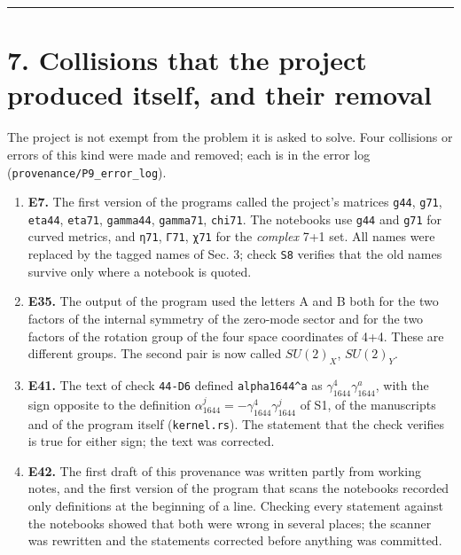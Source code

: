 \documentclass[
  10pt,
]{article}
\providecommand{\tightlist}{%
  \setlength{\itemsep}{0pt}\setlength{\parskip}{0pt}}
\begin{document}
\begin{center}\rule{0.5\linewidth}{0.5pt}\end{center}

\hypertarget{collisions-that-the-project-produced-itself-and-their-removal}{%
\section{7. Collisions that the project produced itself, and their
removal}\label{collisions-that-the-project-produced-itself-and-their-removal}}

The project is not exempt from the problem it is asked to solve. Four
collisions or errors of this kind were made and removed; each is in the
error log (\texttt{provenance/P9\_error\_log}).

\begin{enumerate}
\def\labelenumi{\arabic{enumi}.}
\tightlist
\item
  \textbf{E7.} The first version of the programs called the project's
  matrices \texttt{g44}, \texttt{g71}, \texttt{eta44}, \texttt{eta71},
  \texttt{gamma44}, \texttt{gamma71}, \texttt{chi71}. The notebooks use
  \texttt{g44} and \texttt{g71} for curved metrics, and \texttt{η71},
  \texttt{Γ71}, \texttt{χ71} for the \emph{complex} 7+1 set. All names
  were replaced by the tagged names of Sec. 3; check \texttt{S8}
  verifies that the old names survive only where a notebook is quoted.
\item
  \textbf{E35.} The output of the program used the letters A and B both
  for the two factors of the internal symmetry of the zero-mode sector
  and for the two factors of the rotation group of the four space
  coordinates of 4+4. These are different groups. The second pair is now
  called \(SU(2)_X\), \(SU(2)_Y\).
\item
  \textbf{E41.} The text of check \texttt{44-D6} defined
  \texttt{alpha1644\^{}a} as \(\gamma_{1644}^4\gamma_{1644}^a\), with
  the sign opposite to the definition
  \(\alpha_{1644}^j=-\gamma_{1644}^4\gamma_{1644}^j\) of S1, of the
  manuscripts and of the program itself (\texttt{kernel.rs}). The
  statement that the check verifies is true for either sign; the text
  was corrected.
\item
  \textbf{E42.} The first draft of this provenance was written partly
  from working notes, and the first version of the program that scans
  the notebooks recorded only definitions at the beginning of a line.
  Checking every statement against the notebooks showed that both were
  wrong in several places; the scanner was rewritten and the statements
  corrected before anything was committed.
\end{enumerate}
\end{document}
